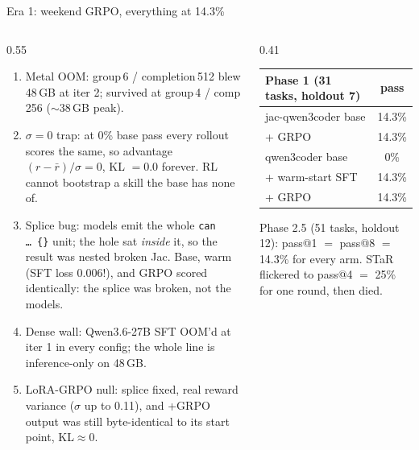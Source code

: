 \documentclass[aspectratio=169,10pt]{beamer}
\begin{document}
\begin{frame}{Era 1: weekend GRPO, everything at 14.3\%}
  \begin{columns}[T]
    \begin{column}{0.55\textwidth}
      \footnotesize
      \begin{enumerate}\itemsep0.4em
        \item Metal OOM: group\,6 / completion\,512 blew 48\,GB at iter 2; survived at group\,4 / comp\,256 ($\sim$38\,GB peak).
        \item $\sigma=0$ trap: at 0\% base pass every rollout scores the same, so advantage $(r-\bar r)/\sigma = 0$, KL $=0.0$ forever. \alert{RL cannot bootstrap a skill the base has none of.}
        \item Splice bug: models emit the whole \texttt{can \ldots\ \{\}} unit; the hole sat \emph{inside} it, so the result was nested broken Jac. Base, warm (SFT loss 0.006!), and GRPO scored identically: the splice was broken, not the models.
        \item Dense wall: Qwen3.6-27B SFT OOM'd at iter 1 in every config; the whole line is inference-only on 48\,GB.
        \item LoRA-GRPO null: splice fixed, real reward variance ($\sigma$ up to 0.11), and +GRPO output was still \alert{byte-identical} to its start point, KL${}\approx{}$0.
      \end{enumerate}
    \end{column}
    \begin{column}{0.41\textwidth}
      \small\centering
      \begin{tabular}{@{}lc@{}}
        \toprule
        Phase 1 (31 tasks, holdout 7) & pass \\
        \midrule
        jac-qwen3coder base & 14.3\% \\
        \quad + GRPO & 14.3\% \\
        qwen3coder base & 0\% \\
        \quad + warm-start SFT & 14.3\% \\
        \quad + GRPO & 14.3\% \\
        \bottomrule
      \end{tabular}

      \vspace{3mm}
      \scriptsize\color{inkmuted}
      Phase 2.5 (51 tasks, holdout 12): pass@1 $=$ pass@8 $=$ 14.3\% for every arm.
      STaR flickered to pass@4 $=$ 25\% for one round, then died.
    \end{column}
  \end{columns}
\end{frame}
\end{document}
